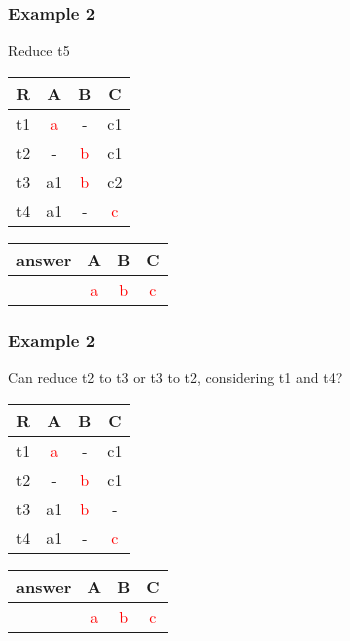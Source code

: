 \documentclass{beamer}
\begin{document}
\begin{frame}
  \frametitle{Example 2}
  Reduce t5
  
  \begin{tabular}{ c | c c c}
  R & A & B & C \\
  \hline
  t1 & \textcolor{red}{a}  & -  & c1 \\
  t2 & -  & \textcolor{red}{b}  & c1 \\
  t3 & a1 & \textcolor{red}{b} & c2 \\
  t4 & a1 & - & \textcolor{red}{c} \\
  \end{tabular}
  \begin{tabular}{ c | c c c}
  answer & A & B & C \\
  \hline
   & \textcolor{red}{a}& \textcolor{red}{b}& \textcolor{red}{c}\\
  \end{tabular}
\end{frame}

\begin{frame}
  \frametitle{Example 2}
  
  Can reduce t2 to t3 or t3 to t2, considering t1 and t4?
  
  \begin{tabular}{ c | c c c}
  R & A & B & C \\
  \hline
  t1 & \textcolor{red}{a}  & -  & c1 \\
  t2 & -  & \textcolor{red}{b}  & c1 \\
  t3 & a1 & \textcolor{red}{b} & - \\
  t4 & a1 & - & \textcolor{red}{c} \\
  \end{tabular}
  \begin{tabular}{ c | c c c}
  answer & A & B & C \\
  \hline
   & \textcolor{red}{a}& \textcolor{red}{b}& \textcolor{red}{c}\\
  \end{tabular}
\end{frame}

\end{document}
